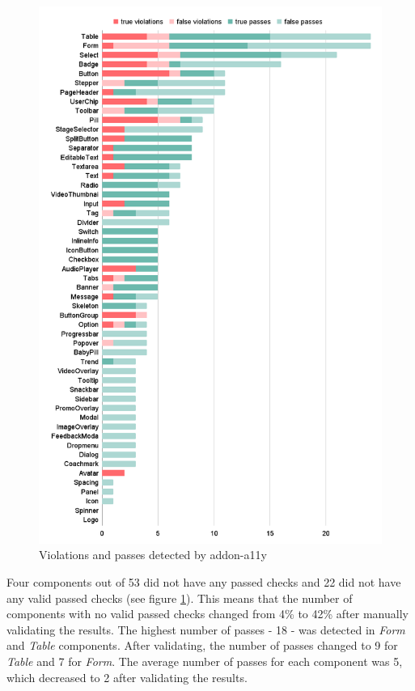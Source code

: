 \documentclass{master_thesis}
\begin{document}
\begin{figure}[H]
	\includegraphics[width=\textwidth]{img/audit-combined.png}
	\caption{Violations and passes detected by addon-a11y}
	\label{fig:audit-combined}
\end{figure}

Four components out of 53 did not have any passed checks and 22 did not have any valid passed checks (see figure \ref{fig:audit-combined}). This means that the number of components with no valid passed checks changed from 4\%  to 42\% after manually validating the results. The highest number of passes - 18 - was detected in \textit{Form} and \textit{Table} components. After validating, the number of passes changed to 9 for \textit{Table} and 7 for \textit{Form}. The average number of passes for each component was 5, which decreased to 2 after validating the results.
\end{document}
